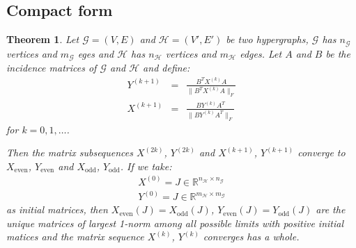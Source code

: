 \documentclass[a4paper,11pt]{report}
\newtheorem{theorem}{Theorem}[section]
\newcommand{\R}{{\mathbb R}}
\newcommand{\graf}{\mathscr{G}}
\newcommand{\grafeen}{\mathscr{H}}
\newcommand{\hgraf}{\mathcal{G}}
\newcommand{\hgrafeen}{\mathcal{H}}
\begin{document}
\subsection{Compact form}
 \begin{theorem}\label{incidencegrootbewijs}
   Let $\hgraf=(V,E)$ and $\hgrafeen=(V',E')$ be two hypergraphs, $\hgraf$ has $n_\hgraf$ 
   vertices and $m_\hgraf$ eges and $\hgrafeen$ has $n_\hgrafeen$ vertices and $m_\hgrafeen$ 
   edges. Let $A$ and $B$ be the incidence matrices of $\hgraf$ and $\hgrafeen$ 
   and define:
 \begin{eqnarray}
  Y^{(k+1)} &=& \frac{B^TX^{(k)}A}{\|B^TX^{(k)}A\|_F}\label{edgehypform}\\
   X^{(k+1)} &=& \frac{BY^{(k)}A^T}{\|BY^{(k)}A^T\|_F}\label{nodehypform}
 \end{eqnarray}
  for  $k =  0,1,\ldots$.
  
  Then the matrix subsequences $X^{(2k)}$, $Y^{(2k)}$ and $X^{(k+1)}$, $Y^{(k+1)}$ 
  converge to $X_{\text{even}}$, $Y_{\text{even}}$ and $X_{\text{odd}}$, 
  $Y_{\text{odd}}$. If we take:
  \begin{eqnarray*}  X^{(0)} = J \in \R^{n_\grafeen \times n_\graf}\\
    Y^{(0)} = J \in \R^{m_\grafeen \times m_\graf}
  \end{eqnarray*}
 as initial matrices, then $X_{\text{even}}(J)=X_{\text{odd}}(J)$, $Y_{\text{even}}(J)= Y_{\text{odd}}(J)$ 
 are the unique matrices of largest 1-norm among all possible limits with positive 
 initial matices and the matrix sequence $X^{(k)}$, $Y^{(k)}$ converges has a 
 whole.
  \end{theorem}
\end{document}
